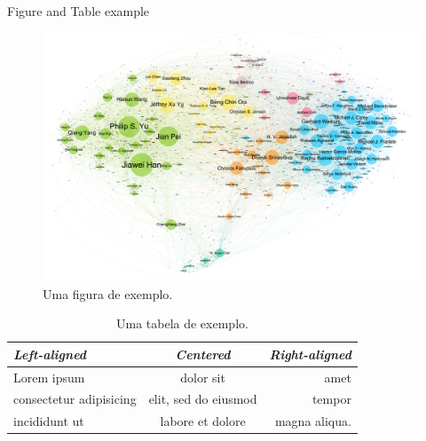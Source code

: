 Figure and Table example
\begin{figure}[t]
    \centering
    \includegraphics[width=\linewidth]{fig/data-management}
    \caption{Uma figura de exemplo.}
    \label{fig:exemplo}
\end{figure}

\begin{table}[t]
    \caption{Uma tabela de exemplo.}
    {\centering
    \begin{tabular}{lcr} \toprule
    \emph{Left-aligned} & \emph{Centered} & \emph{Right-aligned} \\ \midrule
    Lorem ipsum & dolor sit & amet \\
    consectetur adipisicing & elit, sed do eiusmod & tempor \\
    incididunt ut & labore et dolore & magna aliqua. \\ \bottomrule
    \end{tabular}\par
    }
\end{table}
